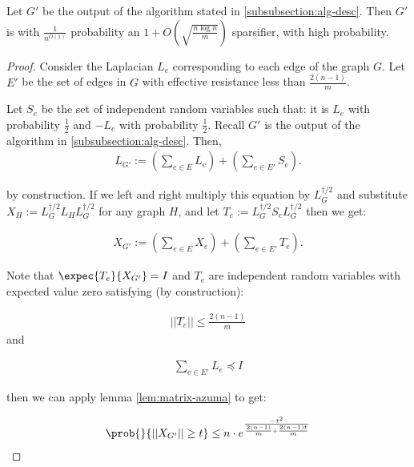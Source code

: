   \begin{lemma} Let $G'$ be the output of the algorithm stated in
  \ref{subsubsection:alg-desc}. Then $G'$ is with $\frac{1}{n^{O(1)}}$ probability an $1+O\left(\sqrt{\frac{n \log n}{m}}\right)$ sparsifier, with high probability. \end{lemma}
    \begin{proof}
      Consider the Laplacian $L_e$ corresponding to each edge of the graph $G$. Let
      $E'$ be the set of edges in $G$ with effective resistance less than
      $\frac{2(n-1)}{m}$.
      
      Let $S_e$ be the set of independent random variables such that: it is
      $L_e$ with probability $\frac{1}{2}$ and $-L_e$ with probability
      $\frac{1}{2}$. Recall $G'$ is the output of the algorithm in
      \ref{subsubsection:alg-desc}. Then,
      \begin{align}
        L_{G'} := \left(\sum_{e \in E} L_e \right) + \left(\sum_{e \in E'}
      S_e\right).
      \end{align}

      by construction. If we left and right multiply this equation by $L_G^{\dag/2}$ and
      substitute $X_{H} := L_G^{\dag/2} L_{H} L_G^{\dag/2}$ for any graph $H$,
      and let $T_e := L_G^{\dag/2} S_{e} L_G^{\dag/2}$ then we
      get: 

      \begin{align}
      X_{G'} := \left(\sum_{e \in E} X_e\right) + \left(\sum_{e \in E'}
      T_e\right).
      \end{align}

      Note that $\expec{T_e}{X_{G'}} = I$ and $T_e$ are independent random
      variables with expected value zero satisfying (by construction):

      \begin{align}
      ||T_e|| \leq \frac{2(n-1)}{m}
      \end{align}
      and 


      \begin{align}
      \sum_{e \in E'} L_e \preceq I
      \end{align}

      then we can apply lemma \ref{lem:matrix-azuma} to get:

      \begin{align}
      \prob{}{||X_{G'} || \geq t} \leq n \cdot
      e^{\frac{-t^2}{\frac{2(n-1)}{m} + \frac{2(n-1)t}{m}}}
      \end{align}


\end{proof}
